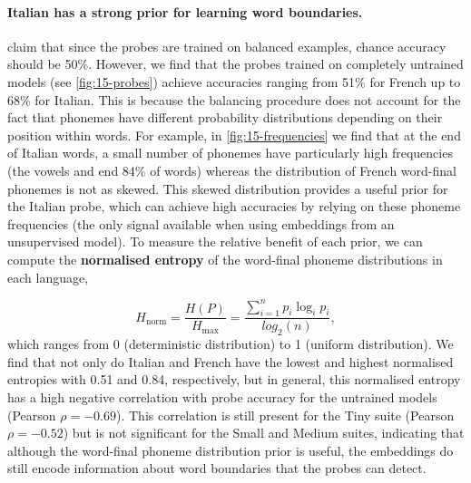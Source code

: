 \paragraph{Italian has a strong prior for learning word boundaries.}
\citet{hahn-baroni-2019-tabula} claim that since the probes are trained on balanced examples, %
chance accuracy should be 50\%. However, we find that the probes trained on completely untrained models (see \cref{fig:15-probes}) achieve accuracies ranging from 51\% for French up to 68\% for Italian. This is because the balancing procedure does not account for the fact that phonemes have different probability distributions depending on their position within words. For example, in \cref{fig:15-frequencies} we find that at the end of Italian words, a small number of phonemes have particularly high frequencies (the vowels  and  end 84\% of words) whereas the distribution of French word-final phonemes is not as skewed. This skewed distribution provides a useful prior for the Italian probe, which can achieve high accuracies by relying on these phoneme frequencies (the only signal available when using embeddings from an unsupervised model). To measure the relative benefit of each prior, we can compute the \textbf{normalised entropy} of the word-final phoneme distributions in each language, 

$$H_\mathrm{norm}=\frac{H(P)}{H_\mathrm{max}} = \frac{\sum_{i=1}^np_i\log_ip_i}{log_2(n)},$$ 
which ranges from 0 (deterministic distribution) to 1 (uniform distribution). We find that not only do Italian and French have the lowest and highest normalised entropies with 0.51 and 0.84, respectively, but in general, this normalised entropy has a high negative correlation with probe accuracy for the untrained models (Pearson $\rho = -0.69$). This correlation is still present for the Tiny suite (Pearson $\rho = -0.52$) but is not significant for the Small and Medium suites, indicating that although the word-final phoneme distribution prior is useful, the embeddings do still encode information about word boundaries that the probes can detect.


